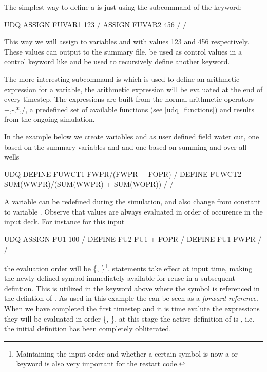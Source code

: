 The simplest way to define a \udq{} is just using the  subcommand of
the \udq{} keyword:
\begin{deck}
UDQ
  ASSIGN FUVAR1 123 /
  ASSIGN FUVAR2 456 /
/
\end{deck}
This way we will assign to variables  and 
with values 123 and 456 respectively. These values can output to the summary
file, be used as control values in a control keyword like  and be
used to recursively define another \udq{} keyword.

The more interesting \udq{} subcommand is  which is used to define an
arithmetic expression for a \udq{} variable, the arithmetic expression will be
evaluated at the end of every timestep. The expressions are built from the
normal arithmetic operators +,-,*,/, a predefined set of available functions
(see \ref{udq_functions}) and results from the ongoing simulation.

In the example below we create \udq{} variables  and  as
user defined field water cut, one based on the summary variables  and
 and one based on summing  and  over all wells
\begin{deck}
UDQ
  DEFINE FUWCT1 FWPR/(FWPR + FOPR) /
  DEFINE FUWCT2 SUM(WWPR)/(SUM(WWPR) + SUM(WOPR)) /
/
\end{deck}

A \udq{} variable can be redefined during the simulation, and also change from
constant  to variable . Observe that \udq{} values are
always evaluated in order of occurence in the input deck. For instance for this
input
\begin{deck}
UDQ
  ASSIGN FU1 100 /
  DEFINE FU2 FU1 + FOPR /
  DEFINE FU1 FWPR /
/
\end{deck}
the evaluation order will be \{, \}\footnote{Maintaining the
input order and whether a certain \udq{} symbol is now a  or
 keyword is also very important for the restart code.}. 
statements take effect at input time, making the newly defined symbol
immediately available for reuse in a subsequent defintion. This is utilized in
the \udq{} keyword above where the symbol  is referenced in the
defintion of . As used in this example the  can be
seen as a \emph{forward reference}. When we have completed the first timestep
and it is time evalute the \udq{} expressions they will be evaluated in order
\{, \}, at this stage the active definition of  is
, i.e. the initial definition  has
been completely obliterated.


